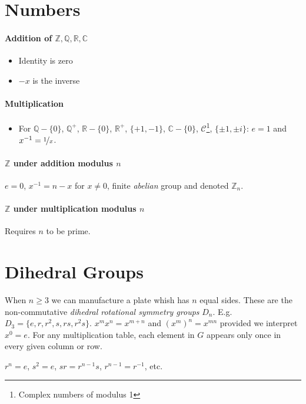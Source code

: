 \documentclass[a4paper,twocolumn,10pt]{article}
\begin{document}
  \section{Numbers}
  \paragraph{Addition of $\mathbb{Z}, \mathbb{Q}, \mathbb{R}, \mathbb{C}$}
  \begin{itemize}
    \item Identity is zero
    \item $-x$ is the inverse
  \end{itemize}
  \paragraph{Multiplication}
  \begin{itemize}
    \item For $\mathbb{Q}-\{0\}$, $\mathbb{Q}^+$, $\mathbb{R}-\{0\}$,
      $\mathbb{R}^+$,
      $\{+1,-1\}$, $\mathbb{C}-\{0\}$, $\mathcal{C}$\footnote{Complex numbers of
      modulus 1}, $\{\pm 1, \pm i\}$: $e=1$ and $x^{-1}=\nicefrac{1}{x}$.
  \end{itemize}

  \paragraph{$\mathbb{Z}$ under addition modulus $n$} $e=0$,
  $x^{-1}=n-x$ for $x\ne0$, finite \textit{abelian} group and denoted
  $\mathbb{Z}_n$.

  \paragraph{$\mathbb{Z}$ under multiplication modulus $n$} Requires $n$ to be
  prime.

  \section{Dihedral Groups}
  When $n\geqslant3$ we can manufacture a plate whish has $n$ equal sides. These are
  the non-commutative \textit{dihedral rotational symmetry groups} $D_n$. E.g.
  $D_3 = \{e,r,r^2,s,rs,r^2s\}$. $x^mx^n=x^{m+n}$ and $(x^m)^n=x^{mn}$ provided
  we interpret $x^0=e$. For any multiplication table, each element in $G$
  appears only once in every given column or row.

  $r^n=e$, $s^2=e$, $sr=r^{n-1}s$, $r^{n-1}=r^{-1}$, etc.
\end{document}
